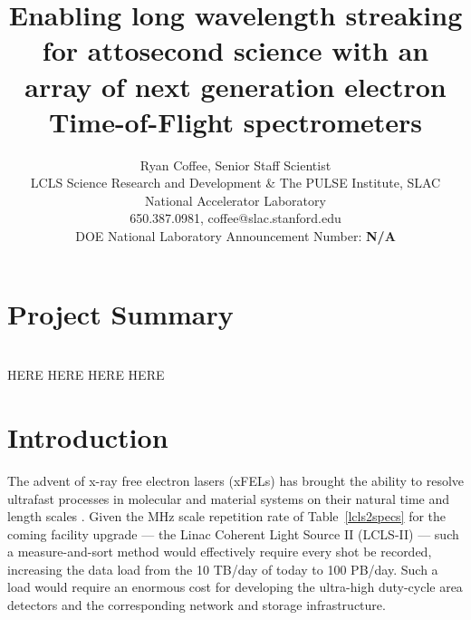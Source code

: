 \documentclass[letterpaper,oneside,11pt]{article}
\title{Enabling long wavelength streaking for attosecond science with an array of next generation electron Time-of-Flight spectrometers}
\author{
Ryan Coffee, Senior Staff Scientist\\
LCLS Science Research and Development \& The PULSE Institute, SLAC National Accelerator Laboratory\\
650.387.0981, coffee@slac.stanford.edu\\
DOE National Laboratory Announcement Number: \textbf{N/A}\\
}
\begin{document}
\pagestyle{fancy}

\section*{Project Summary}


\setcounter{page}{1}

\\

HERE HERE HERE HERE

\section*{Introduction}

The advent of x-ray free electron lasers (xFELs) has brought the ability to resolve ultrafast processes in molecular and material systems on their natural time and length scales \cite{Fritz2007,Katayama2013,Mariano2013,McFarland2014}.
Given the MHz scale repetition rate of Table~\ref{lcls2specs} for the coming facility upgrade --- the Linac Coherent Light Source II (LCLS-II) --- such a measure-and-sort method would effectively require every shot be recorded, increasing the data load from the 10 TB/day of today to 100 PB/day.
Such a load would require an enormous cost for developing the ultra-high duty-cycle area detectors and the corresponding network and storage infrastructure. 
\end{document}

